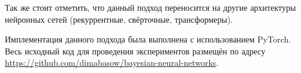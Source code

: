 \documentclass{article}
\begin{document}
Так же стоит отметить, что данный подход переносится на другие архитектуры нейронных сетей (рекуррентные, свёрточные, трансформеры).

Имплементация данного подхода была выполнена с использованием PyTorch. Весь исходный код для проведения экспериментов размещён по адресу \url{https://github.com/dimabasow/bayesian-neural-networks}.
\end{document}

